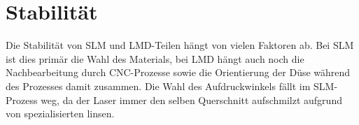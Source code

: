 \documentclass[../main.tex]{subfiles}
\begin{document}
\section{Stabilität}
Die Stabilität von SLM und LMD-Teilen hängt von vielen Faktoren ab. Bei SLM ist dies primär die Wahl des Materials, bei LMD hängt auch noch die Nachbearbeitung durch CNC-Prozesse sowie die Orientierung der Düse während des Prozesses damit zusammen. Die Wahl des Aufdruckwinkels fällt im SLM-Prozess weg, da der Laser immer den selben Querschnitt aufschmilzt aufgrund von spezialisierten linsen.
\end{document}
